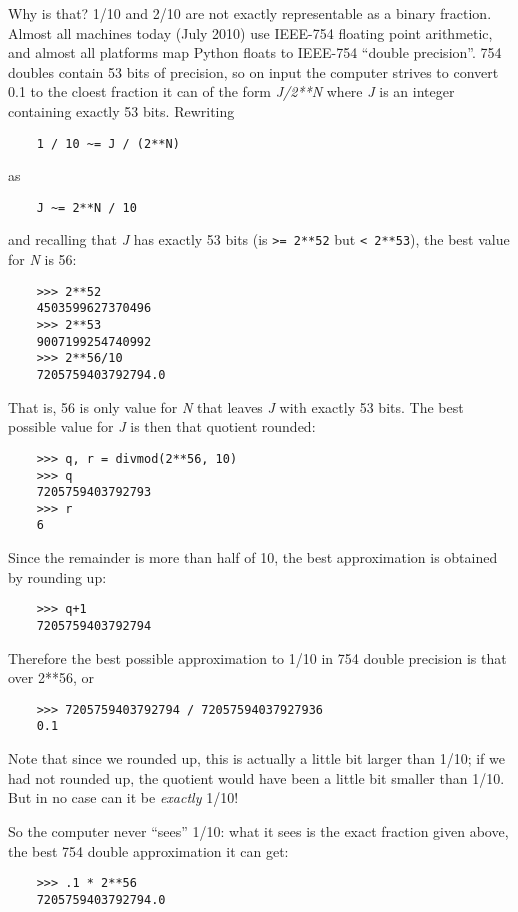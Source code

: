 \documentclass[UTF8]{article}
\begin{document}
Why is that? 1/10 and 2/10 are not exactly representable as a binary fraction. Almost all machines
today (July 2010) use IEEE-754 floating point arithmetic, and almost all platforms map Python
floats to IEEE-754 ``double precision''. 754 doubles contain 53 bits of precision, so on input the
computer strives to convert 0.1 to the cloest fraction it can of the form \emph{J/2**N} where
\emph{J} is an integer containing exactly 53 bits. Rewriting
\begin{verbatim}
    1 / 10 ~= J / (2**N)
\end{verbatim}
as
\begin{verbatim}
    J ~= 2**N / 10
\end{verbatim}
and recalling that \emph{J} has exactly 53 bits (is \texttt{>= 2**52} but \texttt{< 2**53}), the
best value for \emph{N} is 56:
\begin{verbatim}
    >>> 2**52
    4503599627370496
    >>> 2**53
    9007199254740992
    >>> 2**56/10
    7205759403792794.0
\end{verbatim}

That is, 56 is only value for \emph{N} that leaves \emph{J} with exactly 53 bits. The best possible
value for \emph{J} is then that quotient rounded:
\begin{verbatim}
    >>> q, r = divmod(2**56, 10)
    >>> q
    7205759403792793
    >>> r
    6
\end{verbatim}

Since the remainder is more than half of 10, the best approximation is obtained by rounding up:
\begin{verbatim}
    >>> q+1
    7205759403792794
\end{verbatim}

Therefore the best possible approximation to 1/10 in 754 double precision is that over 2**56, or
\begin{verbatim}
    >>> 7205759403792794 / 72057594037927936
    0.1
\end{verbatim}

Note that since we rounded up, this is actually a little bit larger than 1/10; if we had not
rounded up, the quotient would have been a little bit smaller than 1/10. But in no case can it be
\emph{exactly} 1/10!

So the computer never ``sees'' 1/10: what it sees is the exact fraction given above, the best 754
double approximation it can get:
\begin{verbatim}
    >>> .1 * 2**56
    7205759403792794.0
\end{verbatim}
\end{document}
